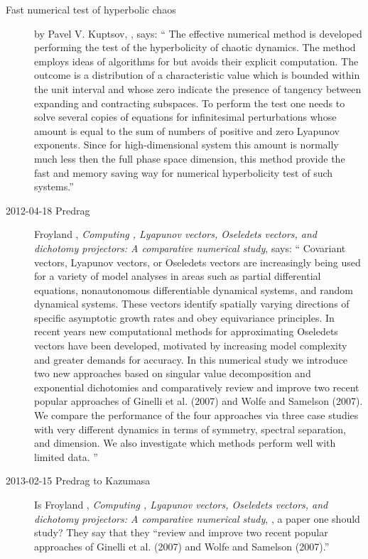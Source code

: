 \begin{description}
\item[Fast numerical test of hyperbolic chaos]
by Pavel V. Kuptsov,
, says:
``
The effective numerical method is developed performing the test of the
hyperbolicity of chaotic dynamics. The method employs ideas of algorithms for
{\cLvs} but avoids their explicit computation. The outcome
is a distribution of a characteristic value which is bounded within the unit
interval and whose zero indicate the presence of tangency between expanding and
contracting subspaces. To perform the test one needs to solve several copies of
equations for infinitesimal perturbations whose amount is equal to the sum of
numbers of positive and zero Lyapunov exponents. Since for high-dimensional
system this amount is normally much less then the full phase space dimension,
this method provide the fast and memory saving way for numerical hyperbolicity
test of such systems.''

\item[2012-04-18 Predrag]
Froyland \etal{},
\emph{Computing {\cLvs}, {Lyapunov} vectors, {Oseledets}
        vectors, and dichotomy projectors: {A} comparative numerical study},
 says: ``
Covariant vectors, Lyapunov vectors, or Oseledets vectors are
increasingly being used for a variety of model analyses in areas such as
partial differential equations, nonautonomous differentiable dynamical
systems, and random dynamical systems. These vectors identify spatially
varying directions of specific asymptotic growth rates and obey
equivariance principles. In recent years new computational methods for
approximating Oseledets vectors have been developed, motivated by
increasing model complexity and greater demands for accuracy. In this
numerical study we introduce two new approaches based on singular value
decomposition and exponential dichotomies and comparatively review and
improve two recent popular approaches of Ginelli et al. (2007) and Wolfe
and Samelson (2007). We compare the performance of the four approaches
via three case studies with very different dynamics in terms of symmetry,
spectral separation, and dimension. We also investigate which methods
perform well with limited data.
''

\item[2013-02-15 Predrag to Kazumasa] Is Froyland
\etal{}, \emph{Computing {\cLvs}, {Lyapunov}
vectors, {Oseledets} vectors, and dichotomy projectors: {A}
comparative numerical study}, , a paper one should
study? They say that they ``review and improve two recent popular
approaches of Ginelli et al. (2007) and Wolfe and
Samelson (2007).''


\end{description}
